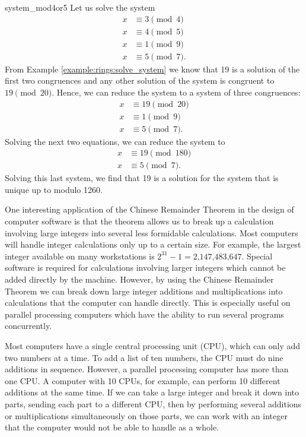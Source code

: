  
\begin{example}{system_mod4or5}
Let us solve the system
\begin{align*}
x & \equiv  3 \pmod{4} \\
x & \equiv  4 \pmod{5} \\
x & \equiv  1 \pmod{9} \\
x & \equiv  5 \pmod{7}. 
\end{align*}
From Example \ref{example:rings:solve_system} we know that 19 is a solution of the first two
congruences and any other solution of the system is congruent to $19
\pmod{20}$. Hence, we can reduce the system to a system of three 
congruences:
\begin{align*}
x & \equiv  19 \pmod{20} \\
x & \equiv  1 \pmod{9} \\
x & \equiv  5 \pmod{7}. 
\end{align*}
Solving the next two equations, we can reduce the system to
\begin{align*}
x & \equiv  19 \pmod{180} \\
x & \equiv  5 \pmod{7}. 
\end{align*}
Solving this last system, we find that 19 is a solution for the system
that is unique up to modulo 1260.
\end{example}
 
 
One interesting application of the Chinese Remainder Theorem in the
design of computer software is that the theorem allows us to break up
a calculation involving large integers into several less formidable
calculations. Most computers will handle integer calculations only up
to a certain size.  For example, the largest integer available on many
workstations is $2^{31} - 1 = \mbox{2,147,483,647}$.  Special
software is required for calculations involving larger integers which 
cannot be added directly by the machine.  However, by using the Chinese
Remainder Theorem we can break down large integer additions and
multiplications into calculations that the computer can handle
directly. This is especially useful on parallel processing computers
which have the ability to
run several programs concurrently. 
 
Most computers have a single central
processing unit (CPU), which can only add two numbers at a time. To add 
a list of ten numbers, the CPU must do nine additions
in sequence. However, a parallel processing computer has more than
one CPU. A computer with 10 CPUs, for example,  can perform 10
different additions at the same time. If we can take a large integer 
and break
it down into parts, sending each part to a different CPU, then by
performing several additions or multiplications
simultaneously on those parts, we can work with an integer that the
computer would not be able to handle as a whole.  
 
